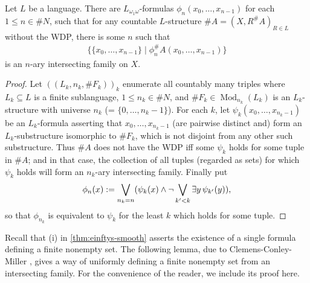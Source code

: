 \documentclass[11pt]{article}
\DeclareMathOperator\Mod{Mod}
\begin{document}
\begin{lemma}
\label{lm:wdp-nif}
Let $L$ be a language.  There are $L_{\omega_1\omega}$-formulas $\phi_n(x_0, \dotsc, x_{n-1})$ for each $1 \le n \in \#N$, such that for any countable $L$-structure $\#A = (X, R^\#A)_{R \in L}$ without the WDP, there is some $n$ such that
\begin{align*}
\{\{x_0, \dotsc, x_{n-1}\} \mid \phi_n^\#A(x_0, \dotsc, x_{n-1})\}
\end{align*}
is an $n$-ary intersecting family on $X$.
\end{lemma}
\begin{proof}
Let $((L_k, n_k, \#F_k))_k$ enumerate all countably many triples where $L_k \subseteq L$ is a finite sublanguage, $1 \le n_k \in \#N$, and $\#F_k \in \Mod_{n_k}(L_k)$ is an $L_k$-structure with universe $n_k$ (= $\{0, \dotsc, n_k-1\}$).  For each $k$, let $\psi_k(x_0, \dotsc, x_{n_k-1})$ be an $L_k$-formula asserting that $x_0, \dotsc, x_{n_k-1}$ (are pairwise distinct and) form an $L_k$-substructure isomorphic to $\#F_k$, which is not disjoint from any other such substructure.  Thus $\#A$ does not have the WDP iff some $\psi_k$ holds for some tuple in $\#A$; and in that case, the collection of all tuples (regarded as sets) for which $\psi_k$ holds will form an $n_k$-ary intersecting family.  Finally put
\begin{align*}
\phi_n(\-x) := \bigvee_{n_k = n} (\psi_k(\-x) \wedge \neg \bigvee_{k' < k} \exists \-y\, \psi_{k'}(\-y)),
\end{align*}
so that $\phi_{n_k}$ is equivalent to $\psi_k$ for the least $k$ which holds for some tuple.
\end{proof}

Recall that (i) in \cref{thm:einftys-smooth} asserts the existence of a single formula defining a finite nonempty set.  The following lemma, due to Clemens-Conley-Miller \cite[4.3]{CCM}, gives a way of uniformly defining a finite nonempty set from an intersecting family.  For the convenience of the reader, we include its proof here.
\end{document}
